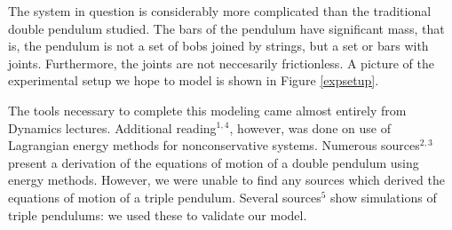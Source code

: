 The system in question is considerably more complicated than the traditional double pendulum studied. The bars of the pendulum have significant mass, that is, the pendulum is not a set of bobs joined by strings, but a set or bars with joints. Furthermore, the joints are not neccesarily frictionless. A picture of the experimental setup we hope to model is shown in Figure \ref{expsetup}.

The tools necessary to complete this modeling came almost entirely from Dynamics lectures.  Additional reading$^{1,4}$, however, was done on use of Lagrangian energy methods for nonconservative systems. Numerous sources$^{2,3}$ present a derivation of the equations of motion of a double pendulum using energy methods. However, we were unable to find any sources which derived the equations of motion of a triple pendulum. Several sources$^{5}$ show simulations of triple pendulums: we used these to validate our model.

